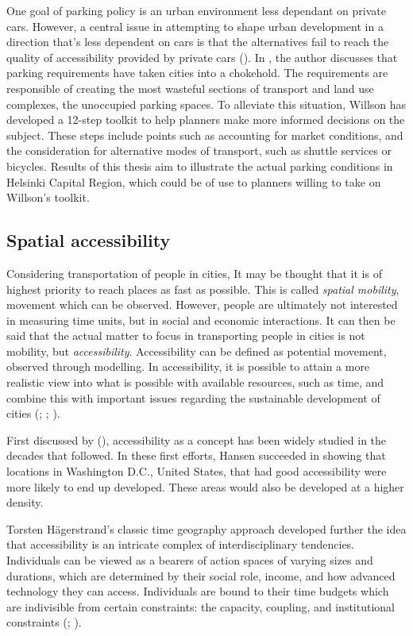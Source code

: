 One goal of parking policy is an urban environment less dependant on private cars. However, a central issue in attempting to shape urban development in a direction that's less dependent on cars is that the alternatives fail to reach the quality of accessibility provided by private cars (\cite{Bertolini2003}). In , the author discusses that parking requirements have taken cities into a chokehold. The requirements are responsible of creating the most wasteful sections of transport and land use complexes, the unoccupied parking spaces. To alleviate this situation, Willson has developed a 12-step toolkit to help planners make more informed decisions on the subject. These steps include points such as accounting for market conditions, and the consideration for alternative modes of transport, such as shuttle services or bicycles. Results of this thesis aim to illustrate the actual parking conditions in Helsinki Capital Region, which could be of use to planners willing to take on Willson's toolkit.

\subsection{Spatial accessibility}
\justify

Considering transportation of people in cities, It may be thought that it is of highest priority to reach places as fast as possible. This is called \textit{spatial mobility}, movement which can be observed. However, people are ultimately not interested in measuring time units, but in social and economic interactions. It can then be said that the actual matter to focus in transporting people in cities is not mobility, but \textit{accessibility}. Accessibility can be defined as potential movement, observed through modelling. In accessibility, it is possible to attain a more realistic view into what is possible with available resources, such as time, and combine this with important issues regarding the sustainable development of cities (\cite{Hodge1997}; \cite{Tenkanen2017}; \cite{Cervero2017}).

First discussed by \citeauthor{Hansen1959} (\citeyear{Hansen1959}), accessibility as a concept has been widely studied in the decades that followed. In these first efforts, Hansen succeeded in showing that locations in Washington D.C., United States, that had good accessibility were more likely to end up developed. These areas would also be developed at a higher density.

Torsten Hägerstrand's classic time geography approach developed further the idea that accessibility is an intricate complex of interdisciplinary tendencies. Individuals can be viewed as a bearers of action spaces of varying sizes and durations, which are determined by their social role, income, and how advanced technology they can access. Individuals are bound to their time budgets which are indivisible from certain constraints: the capacity, coupling, and institutional constraints (\cite{Wegener1999}; \cite{Hagerstrand1970}).

